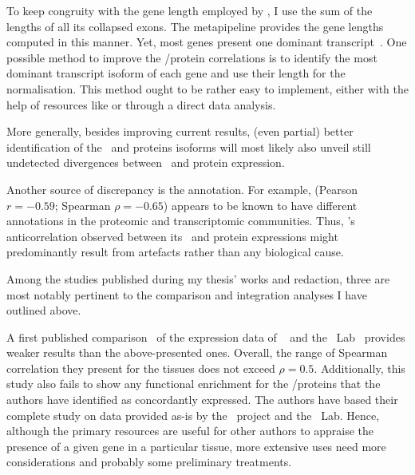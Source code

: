 To keep congruity with the gene length
employed by ,
I use the sum of the lengths of all its collapsed exons.
The metapipeline
 provides
the gene lengths computed in this manner.
Yet, most genes present one dominant transcript~.
One possible method to improve the \mRNA/protein correlations
is to identify the most dominant transcript isoform of each gene
and use their length for the normalisation.
This method ought to be rather easy to implement,
either with the help of resources like
or through a direct data analysis.\mybr\

More generally,
besides improving current results,
(even partial) better identification of the \mRNAs\ and proteins isoforms
will most likely also unveil still undetected divergences
between \mRNA\ and protein expression.\mybr\

Another source of discrepancy is the annotation.
For example,  (Pearson $r=-0.59$; Spearman $\rho=-0.65$)
appears to be known to have different annotations
in the proteomic and transcriptomic communities.
Thus, 's anticorrelation observed
between its \mRNA\ and protein expressions
might predominantly result from artefacts
rather than any biological cause.


Among the studies published during my thesis' works and redaction,
three are most notably pertinent to the comparison and integration analyses
I have outlined above.

A first published comparison~ of the expression data of
\gtex\  and the \pandey\ Lab~
provides weaker results than the above-presented ones.
Overall, the range of Spearman correlation they present for the tissues
does not exceed $\rho=0.5$.
Additionally, this study also fails to show any functional enrichment
for the \mRNA/proteins that the authors have identified as concordantly expressed.
The authors have based their complete study on data provided as-is
by the \gtex\ project and the \pandey\ Lab.
Hence, although the primary resources are useful
for other authors to appraise the presence of a given gene in a particular tissue,
more extensive uses need more considerations
and probably some preliminary treatments.\mybr\


